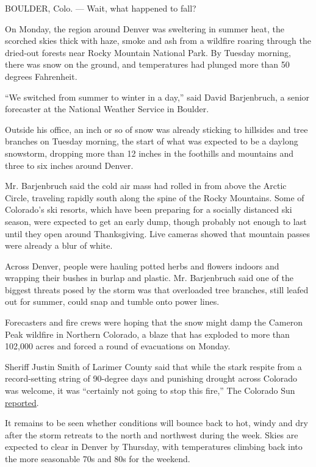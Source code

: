 BOULDER, Colo. --- Wait, what happened to fall?

On Monday, the region around Denver was sweltering in summer heat, the
scorched skies thick with haze, smoke and ash from a wildfire roaring
through the dried-out forests near Rocky Mountain National Park. By
Tuesday morning, there was snow on the ground, and temperatures had
plunged more than 50 degrees Fahrenheit.

``We switched from summer to winter in a day,'' said David Barjenbruch,
a senior forecaster at the National Weather Service in Boulder.

Outside his office, an inch or so of snow was already sticking to
hillsides and tree branches on Tuesday morning, the start of what was
expected to be a daylong snowstorm, dropping more than 12 inches in the
foothills and mountains and three to six inches around Denver.

Mr. Barjenbruch said the cold air mass had rolled in from above the
Arctic Circle, traveling rapidly south along the spine of the Rocky
Mountains. Some of Colorado's ski resorts, which have been preparing for
a socially distanced ski season, were expected to get an early dump,
though probably not enough to last until they open around Thanksgiving.
Live cameras showed that mountain passes were already a blur of white.

Across Denver, people were hauling potted herbs and flowers indoors and
wrapping their bushes in burlap and plastic. Mr. Barjenbruch said one of
the biggest threats posed by the storm was that overloaded tree
branches, still leafed out for summer, could snap and tumble onto power
lines.

Forecasters and fire crews were hoping that the snow might damp the
Cameron Peak wildfire in Northern Colorado, a blaze that has exploded to
more than 102,000 acres and forced a round of evacuations on Monday.

Sheriff Justin Smith of Larimer County said that while the stark respite
from a record-setting string of 90-degree days and punishing drought
across Colorado was welcome, it was ``certainly not going to stop this
fire,'' The Colorado Sun
\href{https://coloradosun.com/2020/09/07/cameron-peak-fire-update-structures/}{reported}.

It remains to be seen whether conditions will bounce back to hot, windy
and dry after the storm retreats to the north and northwest during the
week. Skies are expected to clear in Denver by Thursday, with
temperatures climbing back into the more seasonable 70s and 80s for the
weekend.

